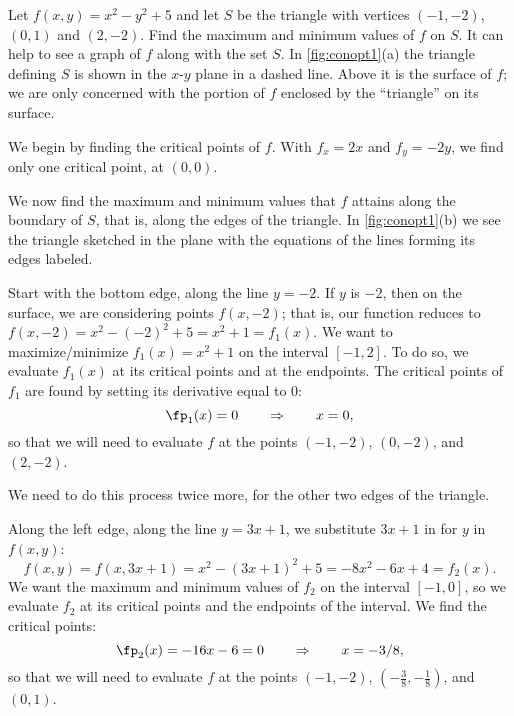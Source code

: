 \begin{example}\label{ex_conopt1}
Let $f(x,y) = x^2-y^2+5$ and let $S$ be the triangle with vertices $(-1,-2)$, $(0,1)$ and $(2,-2)$. Find the maximum and minimum values of $f$ on $S$.
\solution
It can help to see a graph of $f$ along with the set $S$. In \autoref{fig:conopt1}(a) the triangle defining $S$ is shown in the $x$-$y$ plane in a dashed line. Above it is the surface of $f$; we are only concerned with the portion of $f$ enclosed by the ``triangle'' on its surface. 

We begin by finding the critical points of $f$. With $f_x = 2x$ and $f_y = -2y$, we find only one critical point, at $(0,0)$. 

We now find the maximum and minimum values that $f$ attains along the boundary of $S$, that is, along the edges of the triangle. In \autoref{fig:conopt1}(b) we see the triangle sketched in the plane with the equations of the lines forming its edges labeled. 

Start with the bottom edge, along the line $y=-2$. If $y$ is $-2$, then on the surface, we are considering points $f(x,-2)$; that is, our function reduces to $f(x,-2) = x^2-(-2)^2+5 = x^2+1=f_1(x)$. We want to maximize/minimize $f_1(x)=x^2+1$ on the interval $[-1,2]$. To do so, we evaluate $f_1(x)$ at its critical points and at the endpoints.  The critical points of $f_1$ are found by setting its derivative equal to 0:
\[\fp_1(x)=0\qquad \Rightarrow\qquad x=0,\]
so that we will need to evaluate $f$ at the points $(-1,-2)$, $(0,-2)$, and $(2,-2)$.

We need to do this process twice more, for the other two edges of the triangle.

Along the left edge, along the line $y=3x+1$, we substitute $3x+1$ in for $y$ in $f(x,y)$:
\[f(x,y) = f(x,3x+1) = x^2-(3x+1)^2+5 = -8x^2-6x+4 = f_2(x).\]
We want the maximum and minimum values of $f_2$ on the interval $[-1,0]$, so we evaluate $f_2$ at its critical points and the endpoints of the interval. We find the critical points:
\[\fp_2(x) = -16x-6=0 \qquad \Rightarrow \qquad x=-3/8,\]
so that we will need to evaluate $f$ at the points $(-1,-2)$, $(-\frac38,-\frac18)$, and $(0,1)$.


\end{example}

